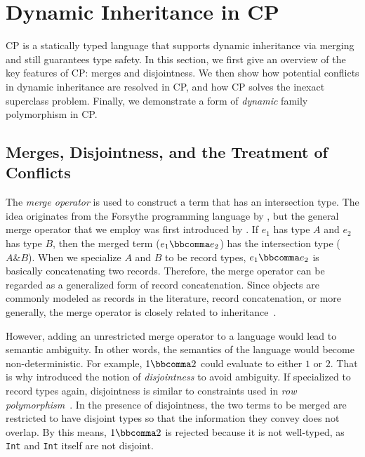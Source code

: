 \section{Dynamic Inheritance in CP} \label{sec:overview}

CP is a statically typed language that supports dynamic inheritance via merging
and still guarantees type safety. In this section, we first give an overview of
the key features of CP: merges and disjointness. We then show how potential
conflicts in dynamic inheritance are resolved in CP, and how CP solves the
inexact superclass problem. Finally, we demonstrate a form of \emph{dynamic}
family polymorphism in CP.

\subsection{Merges, Disjointness, and the Treatment of Conflicts}\label{sec:merge}

The \emph{merge operator} is used to construct a term that has an intersection
type. The idea originates from the Forsythe programming language by
\citet{reynolds1997design}, but the general merge operator that we employ was
first introduced by \citet{dunfield2014elaborating}. If $e_1$ has type $A$ and
$e_2$ has type $B$, then the merged term ($e_1 \bbcomma e_2$) has the
intersection type ($A\&B$). When we specialize $A$ and $B$ to be record types,
$e_1 \bbcomma e_2$ is basically concatenating two records. Therefore, the merge
operator can be regarded as a generalized form of record concatenation. Since
objects are commonly modeled as records in the literature, record concatenation,
or more generally, the merge operator is closely related to
inheritance~\citep{wand1991type,cook1989denotational}.

However, adding an unrestricted merge operator to a language would lead to
semantic ambiguity. In other words, the semantics of the language would become
non-deterministic. For example, $1\bbcomma2$ could evaluate to either $1$ or
$2$. That is why \citet{oliveira2016disjoint} introduced the notion of
\emph{disjointness} to avoid ambiguity. If specialized to record types again,
disjointness is similar to constraints used in \emph{row
polymorphism}~\citep{harper1991record}. In the presence of disjointness, the two
terms to be merged are restricted to have disjoint types so that the information
they convey does not overlap. By this means, $1\bbcomma2$ is rejected because it
is not well-typed, as \lstinline{Int} and \lstinline{Int} itself are not
disjoint.

